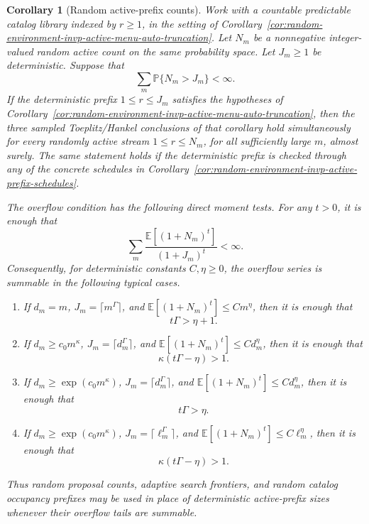 \documentclass[11pt]{amsart}
\numberwithin{equation}{section}
\newtheorem{corollary}[theorem]{Corollary}
\theoremstyle{definition}
\theoremstyle{remark}
\newcommand{\Prob}{\mathbb P}
\newcommand{\Exp}{\mathbb E}
\begin{document}
\begin{corollary}[Random active-prefix counts]
\label{cor:random-environment-invp-random-active-prefix-counts}
Work with a countable predictable catalog library indexed by \(r\ge1\), in the
setting of
Corollary~\ref{cor:random-environment-invp-active-menu-auto-truncation}.  Let
\(N_m\) be a nonnegative integer-valued random active count on the same
probability space.  Let \(J_m\ge1\) be deterministic.  Suppose that
\[
  \sum_m \Prob\{N_m>J_m\}<\infty .
\]
If the deterministic prefix \(1\le r\le J_m\) satisfies the hypotheses of
Corollary~\ref{cor:random-environment-invp-active-menu-auto-truncation}, then
the three sampled Toeplitz/Hankel conclusions of that corollary hold
simultaneously for every randomly active stream \(1\le r\le N_m\), for all
sufficiently large \(m\), almost surely.  The same statement holds if the
deterministic prefix is checked through any of the concrete schedules in
Corollary~\ref{cor:random-environment-invp-active-prefix-schedules}.

The overflow condition has the following direct moment tests.  For any \(t>0\),
it is enough that
\[
  \sum_m
  \frac{\Exp[(1+N_m)^t]}{(1+J_m)^t}<\infty .
\]
Consequently, for deterministic constants \(C,\eta\ge0\), the overflow series
is summable in the following typical cases.
\begin{enumerate}[label=\textup{(\roman*)},leftmargin=2.2em]
\item If \(d_m=m\), \(J_m=\lceil m^\Gamma\rceil\), and
\(\Exp[(1+N_m)^t]\le Cm^\eta\), then it is enough that
\[
  t\Gamma>\eta+1 .
\]
\item If \(d_m\ge c_0m^\kappa\), \(J_m=\lceil d_m^\Gamma\rceil\), and
\(\Exp[(1+N_m)^t]\le Cd_m^\eta\), then it is enough that
\[
  \kappa(t\Gamma-\eta)>1 .
\]
\item If \(d_m\ge\exp(c_0m^\kappa)\), \(J_m=\lceil d_m^\Gamma\rceil\), and
\(\Exp[(1+N_m)^t]\le Cd_m^\eta\), then it is enough that
\[
  t\Gamma>\eta .
\]
\item If \(d_m\ge\exp(c_0m^\kappa)\), \(J_m=\lceil\ell_m^\Gamma\rceil\), and
\(\Exp[(1+N_m)^t]\le C\ell_m^\eta\), then it is enough that
\[
  \kappa(t\Gamma-\eta)>1 .
\]
\end{enumerate}
Thus random proposal counts, adaptive search frontiers, and random catalog
occupancy prefixes may be used in place of deterministic active-prefix sizes
whenever their overflow tails are summable.
\end{corollary}
\end{document}
